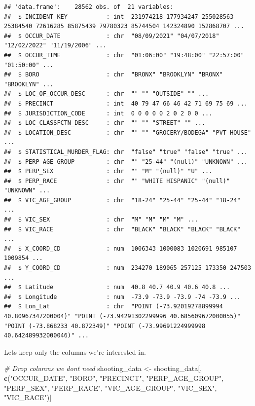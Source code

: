 \documentclass[
]{article}
\newenvironment{Shaded}{\begin{snugshade}}{\end{snugshade}}
\newcommand{\CommentTok}[1]{\textcolor[rgb]{0.56,0.35,0.01}{\textit{#1}}}
\newcommand{\FunctionTok}[1]{\textcolor[rgb]{0.13,0.29,0.53}{\textbf{#1}}}
\newcommand{\NormalTok}[1]{#1}
\newcommand{\OtherTok}[1]{\textcolor[rgb]{0.56,0.35,0.01}{#1}}
\newcommand{\StringTok}[1]{\textcolor[rgb]{0.31,0.60,0.02}{#1}}
\begin{document}
\begin{verbatim}
## 'data.frame':    28562 obs. of  21 variables:
##  $ INCIDENT_KEY           : int  231974218 177934247 255028563 25384540 72616285 85875439 79780323 85744504 142324890 152868707 ...
##  $ OCCUR_DATE             : chr  "08/09/2021" "04/07/2018" "12/02/2022" "11/19/2006" ...
##  $ OCCUR_TIME             : chr  "01:06:00" "19:48:00" "22:57:00" "01:50:00" ...
##  $ BORO                   : chr  "BRONX" "BROOKLYN" "BRONX" "BROOKLYN" ...
##  $ LOC_OF_OCCUR_DESC      : chr  "" "" "OUTSIDE" "" ...
##  $ PRECINCT               : int  40 79 47 66 46 42 71 69 75 69 ...
##  $ JURISDICTION_CODE      : int  0 0 0 0 0 2 0 2 0 0 ...
##  $ LOC_CLASSFCTN_DESC     : chr  "" "" "STREET" "" ...
##  $ LOCATION_DESC          : chr  "" "" "GROCERY/BODEGA" "PVT HOUSE" ...
##  $ STATISTICAL_MURDER_FLAG: chr  "false" "true" "false" "true" ...
##  $ PERP_AGE_GROUP         : chr  "" "25-44" "(null)" "UNKNOWN" ...
##  $ PERP_SEX               : chr  "" "M" "(null)" "U" ...
##  $ PERP_RACE              : chr  "" "WHITE HISPANIC" "(null)" "UNKNOWN" ...
##  $ VIC_AGE_GROUP          : chr  "18-24" "25-44" "25-44" "18-24" ...
##  $ VIC_SEX                : chr  "M" "M" "M" "M" ...
##  $ VIC_RACE               : chr  "BLACK" "BLACK" "BLACK" "BLACK" ...
##  $ X_COORD_CD             : num  1006343 1000083 1020691 985107 1009854 ...
##  $ Y_COORD_CD             : num  234270 189065 257125 173350 247503 ...
##  $ Latitude               : num  40.8 40.7 40.9 40.6 40.8 ...
##  $ Longitude              : num  -73.9 -73.9 -73.9 -74 -73.9 ...
##  $ Lon_Lat                : chr  "POINT (-73.92019278899994 40.80967347200004)" "POINT (-73.94291302299996 40.685609672000055)" "POINT (-73.868233 40.872349)" "POINT (-73.99691224999998 40.642489932000046)" ...
\end{verbatim}

Lets keep only the columns we're interested in.

\begin{Shaded}
\begin{Highlighting}[]
\CommentTok{\# Drop columns we don\textquotesingle{}t need}
\NormalTok{shooting\_data }\OtherTok{\textless{}{-}}\NormalTok{ shooting\_data[, }\FunctionTok{c}\NormalTok{(}\StringTok{"OCCUR\_DATE"}\NormalTok{, }\StringTok{"BORO"}\NormalTok{, }\StringTok{"PRECINCT"}\NormalTok{, }\StringTok{"PERP\_AGE\_GROUP"}\NormalTok{, }\StringTok{"PERP\_SEX"}\NormalTok{, }\StringTok{"PERP\_RACE"}\NormalTok{, }\StringTok{"VIC\_AGE\_GROUP"}\NormalTok{, }\StringTok{"VIC\_SEX"}\NormalTok{, }\StringTok{"VIC\_RACE"}\NormalTok{)]}
\end{Highlighting}
\end{Shaded}
\end{document}
